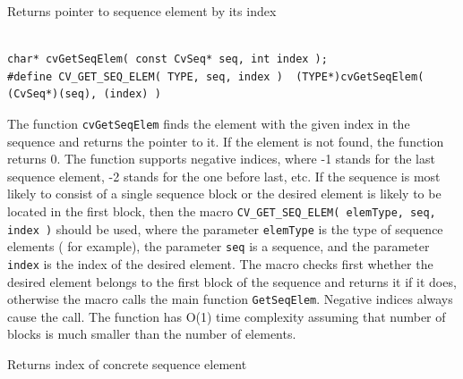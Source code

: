 \label{GetSeqElem}

Returns pointer to sequence element by its index

\begin{lstlisting}

char* cvGetSeqElem( const CvSeq* seq, int index );
#define CV_GET_SEQ_ELEM( TYPE, seq, index )  (TYPE*)cvGetSeqElem( (CvSeq*)(seq), (index) )

\end{lstlisting}

\begin{description}
\end{description}


The function \texttt{cvGetSeqElem} finds the element with the given
index in the sequence and returns the pointer to it. If the element
is not found, the function returns 0. The function supports negative
indices, where -1 stands for the last sequence element, -2 stands for
the one before last, etc. If the sequence is most likely to consist of
a single sequence block or the desired element is likely to be located
in the first block, then the macro
\texttt{CV\_GET\_SEQ\_ELEM( elemType, seq, index )}
should be used, where the parameter \texttt{elemType} is the
type of sequence elements (  for example), the parameter
\texttt{seq} is a sequence, and the parameter \texttt{index} is the index
of the desired element. The macro checks first whether the desired element
belongs to the first block of the sequence and returns it if it does,
otherwise the macro calls the main function \texttt{GetSeqElem}. Negative
indices always cause the  call. The function has O(1)
time complexity assuming that number of blocks is much smaller than the
number of elements.

\label{SeqElemIdx}

Returns index of concrete sequence element


\begin{description}
\end{description}

